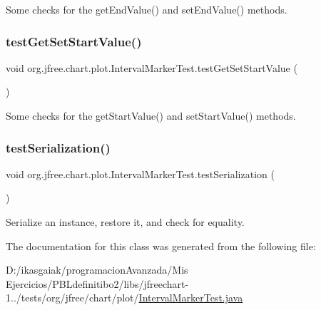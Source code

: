 Some checks for the get\+End\+Value() and set\+End\+Value() methods. \mbox{\label{classorg_1_1jfree_1_1chart_1_1plot_1_1_interval_marker_test_a09d2cff78b28a234d38e88fd18caeb90}} 
\subsubsection{\texorpdfstring{test\+Get\+Set\+Start\+Value()}{testGetSetStartValue()}}
{\footnotesize\ttfamily void org.\+jfree.\+chart.\+plot.\+Interval\+Marker\+Test.\+test\+Get\+Set\+Start\+Value (\begin{DoxyParamCaption}{ }\end{DoxyParamCaption})}

Some checks for the get\+Start\+Value() and set\+Start\+Value() methods. \mbox{\label{classorg_1_1jfree_1_1chart_1_1plot_1_1_interval_marker_test_a23f04e81a75053ad83202e29d768b074}} 
\subsubsection{\texorpdfstring{test\+Serialization()}{testSerialization()}}
{\footnotesize\ttfamily void org.\+jfree.\+chart.\+plot.\+Interval\+Marker\+Test.\+test\+Serialization (\begin{DoxyParamCaption}{ }\end{DoxyParamCaption})}

Serialize an instance, restore it, and check for equality. 

The documentation for this class was generated from the following file\+:\begin{DoxyCompactItemize}
\item 
D\+:/ikasgaiak/programacion\+Avanzada/\+Mis Ejercicios/\+P\+B\+Ldefinitibo2/libs/jfreechart-\/1../tests/org/jfree/chart/plot/\mbox{\hyperlink{_interval_marker_test_8java}{Interval\+Marker\+Test.\+java}}\end{DoxyCompactItemize}
